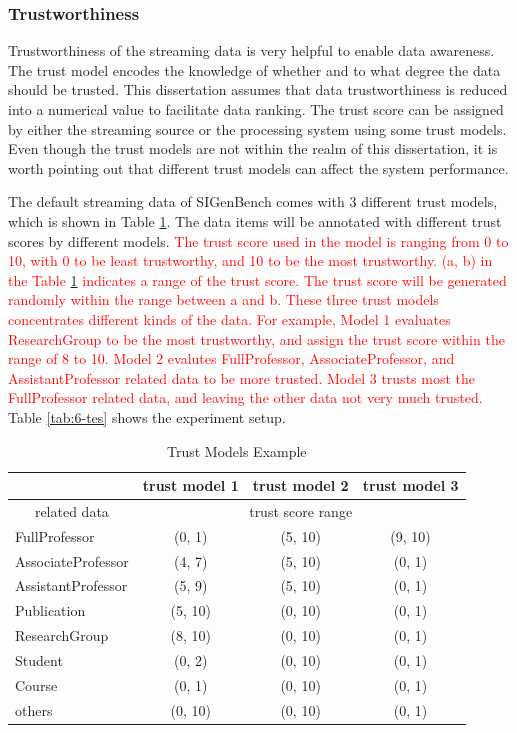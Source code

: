 \subsubsection{Trustworthiness}
Trustworthiness of the streaming data is very helpful to enable data awareness. 
The trust model encodes the knowledge of whether and to what degree the data should be trusted.
This dissertation assumes that data trustworthiness is reduced into a numerical value to facilitate data ranking.
The trust score can be assigned by either the streaming source or the processing system using some trust models. 
Even though the trust models are not within the realm of this dissertation, it is worth pointing out that different trust models can affect the system performance. 

The default streaming data of SIGenBench comes with 3 different trust models, which is shown in Table \ref{tab:6-tme}.
The data items will be annotated with different trust scores by different models.
\textcolor{red}{
The trust score used in the model is ranging from 0 to 10, with 0 to be least trustworthy, and 10 to be the most trustworthy.
(a, b) in the Table \ref{tab:6-tme} indicates a range of the trust score. 
The trust score will be generated randomly within the range between a and b. 
These three trust models concentrates different kinds of the data. 
For example, Model 1 evaluates ResearchGroup to be the most trustworthy, and assign the trust score within the range of 8 to 10.
Model 2 evalutes FullProfessor, AssociateProfessor, and AssistantProfessor related data to be more trusted.
Model 3 trusts most the FullProfessor related data, and leaving the other data not very much trusted.
}
Table \ref{tab:6-tes} shows the experiment setup.

\begin{table}[!htbp]
	\centering
    \caption{Trust Models Example}
    \label{tab:6-tme}
    \begin{tabular}{|l||c|c|c|} \hline
    	& trust model 1 & trust model 2 & trust model 3 \\ \hline
     \multicolumn{1}{|c||}{related data} & \multicolumn{3}{c|}{trust score range} \\ \hhline{|=#=|=|=|}
     FullProfessor & (0, 1) & (5, 10) & (9, 10) \\ \hline
     AssociateProfessor & (4, 7) & (5, 10) & (0, 1) \\ \hline
     AssistantProfessor & (5, 9) & (5, 10) & (0, 1) \\ \hline
     Publication & (5, 10) & (0, 10) & (0, 1) \\ \hline
     ResearchGroup & (8, 10) & (0, 10) & (0, 1) \\ \hline
     Student & (0, 2) & (0, 10) & (0, 1) \\ \hline
     Course & (0, 1) & (0, 10) & (0, 1) \\ \hline
     others & (0, 10) & (0, 10) & (0, 1) \\ \hline    
    \end{tabular}
\end{table} 

